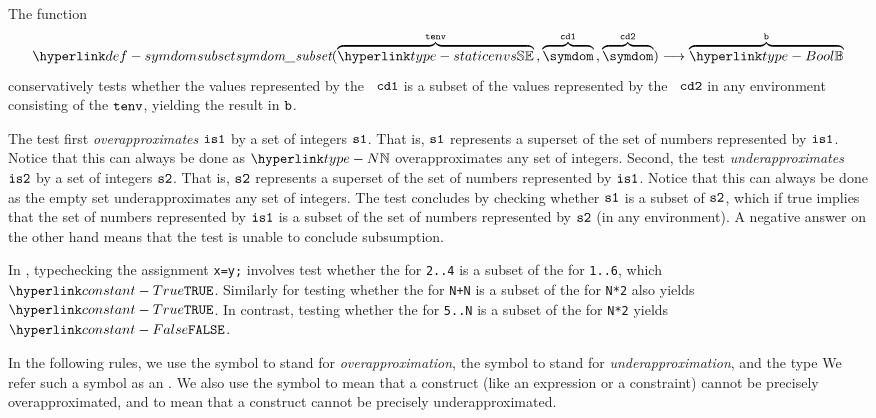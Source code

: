 \hypertarget{def-symdomsubset}{}
The function
\[
  \symdomsubset(
    \overname{\staticenvs}{\tenv} \aslsep
    \overname{\symdom}{\cdone} \aslsep
    \overname{\symdom}{\cdtwo}
  ) \aslto
  \overname{\Bool}{\vb}
\]
conservatively tests whether the values represented by the \symbolicdomainterm\ $\texttt{cd1}$
is a subset of the values represented by the \symbolicdomainterm\ $\texttt{cd2}$ in any environment
consisting of the \staticenvironmentterm{} $\texttt{tenv}$, yielding the result in $\texttt{b}$.

The test first \emph{overapproximates} $\texttt{is1}$ by a set of integers $\texttt{s1}$.
That is, $\texttt{s1}$ represents a superset of the set of numbers represented by $\texttt{is1}$.
Notice that this can always be done as $\N$ overapproximates any set of integers.
%
Second, the test \emph{underapproximates} $\texttt{is2}$ by a set of integers $\texttt{s2}$.
That is, $\texttt{s2}$ represents a superset of the set of numbers represented by $\texttt{is1}$.
Notice that this can always be done as the empty set underapproximates any set of integers.
%
The test concludes by checking whether $\texttt{s1}$ is a subset of $\texttt{s2}$,
which if true implies that the set of numbers represented by $\texttt{is1}$ is a subset of the
set of numbers represented by $\texttt{s2}$ (in any environment).
A negative answer on the other hand means that the
test is unable to conclude subsumption.

In , typechecking the assignment \verb|x=y;|
involves test whether the \symbolicdomainterm{} for \verb|2..4| is a subset of the
\symbolicdomainterm{} for \verb|1..6|, which $\True$.
Similarly for testing whether the \symbolicdomainterm{} for \verb|N+N|
is a subset of the \symbolicdomainterm{} for \verb|N*2| also yields $\True$.
In contrast, testing whether the \symbolicdomainterm{} for \verb|5..N|
is a subset of the \symbolicdomainterm{} for \verb|N*2| yields $\False$.

\hypertarget{def-approximationdirectionterm}{}
In the following rules, we use the symbol  to stand for \emph{overapproximation},
the symbol  to stand for \emph{underapproximation},
and the type 
We refer such a symbol as an \approximationdirectionterm.
We also use the symbol  to mean that a construct
(like an expression or a constraint) cannot be precisely overapproximated,
and  to mean that a construct cannot be precisely
underapproximated.

